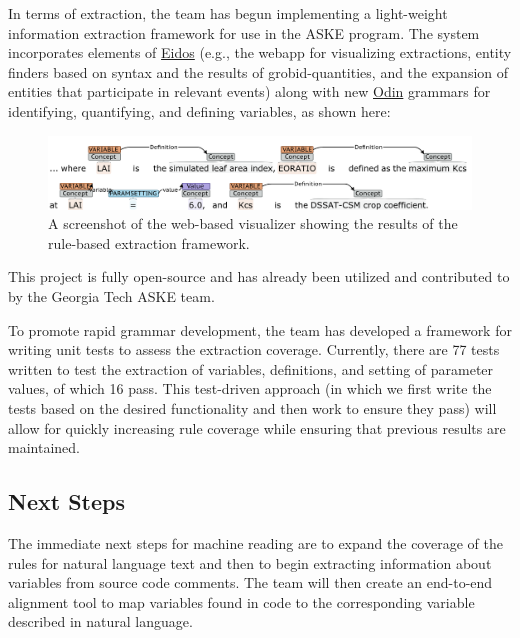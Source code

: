 \documentclass[article, 12pt, oneside]{memoir}
\begin{document}
In terms of extraction, the team has begun implementing a light-weight
information extraction framework for use in the ASKE program. The system
incorporates elements of \href{https://github.com/clulab/eidos}{Eidos}
(e.g., the webapp for visualizing extractions, entity finders based on
syntax and the results of grobid-quantities, and the expansion of
entities that participate in relevant events) along with new
\href{http://clulab.cs.arizona.edu/papers/lrec2016-odin.pdf}{Odin}
grammars for identifying, quantifying, and defining variables, as shown
here:

\begin{figure}[h]
\centering
\includegraphics{figs/extractions.png}
\caption{A screenshot of the web-based visualizer showing the results of
the rule-based extraction framework.}
\end{figure}

This project is fully open-source and has already been utilized and
contributed to by the Georgia Tech ASKE team.

To promote rapid grammar development, the team has developed a framework
for writing unit tests to assess the extraction coverage. Currently,
there are 77 tests written to test the extraction of variables,
definitions, and setting of parameter values, of which 16 pass. This
test-driven approach (in which we first write the tests based on the
desired functionality and then work to ensure they pass) will allow for
quickly increasing rule coverage while ensuring that previous results
are maintained.

\hypertarget{next-steps}{%
\subsection{Next Steps}\label{next-steps}}

The immediate next steps for machine reading are to expand the coverage
of the rules for natural language text and then to begin extracting
information about variables from source code comments. The team will
then create an end-to-end alignment tool to map variables found in code
to the corresponding variable described in natural language.

\end{document}
